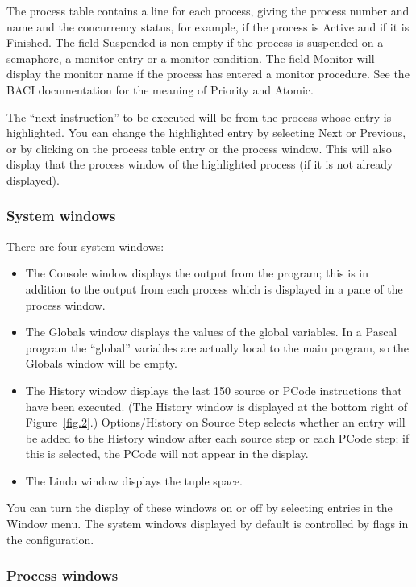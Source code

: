 \documentclass[11pt]{article}
\newcommand{\baci}{\textsc{\sffamily BACI}}
\newcommand{\bu}[1]{\textsf{#1}}
\begin{document}
The process table contains a line for each process,
giving the process number and name and the concurrency status,
for example, if the process is \bu{Active}
and if it is \bu{Finished}.
The field \bu{Suspended} is non-empty if the process is
suspended on a semaphore, a monitor entry or a monitor condition.
The field \bu{Monitor} will display the monitor name if the
process has entered a monitor procedure.
See the \baci{} documentation for the meaning
of \bu{Priority} and \bu{Atomic}.

The ``next instruction'' to be executed will be
from the process whose entry is highlighted.
You can change the highlighted entry by selecting \bu{Next}
or \bu{Previous}, or by clicking on the process table entry or the process window.
This will also display that the process window of the highlighted process (if
it is not already displayed).

\subsubsection{System windows}

There are four system windows:
\begin{itemize}
\item The \bu{Console} window displays the output from the program;
this is in addition to the output from each process which is displayed
in a pane of the process window.
\item The \bu{Globals} window displays the values of the global variables.
In a Pascal program the ``global'' variables are actually
local to the main program, so the \bu{Globals} window will
be empty.
\item The \bu{History} window displays the last 150 source or PCode instructions
that have been executed.
(The \bu{History} window is displayed at the bottom right
of Figure~\ref{fig.2}.)
\bu{Options/History on Source Step} selects whether an entry will be
added to the \bu{History} window after each source step or each PCode step;
if this is selected, the PCode will not appear in the display.
\item The \bu{Linda} window displays the tuple space.
\end{itemize}
You can turn the display of these windows on or off by selecting
entries in the \bu{Window} menu.
The system windows displayed by default
is controlled by flags in the configuration.

\subsubsection{Process windows}
\end{document}
